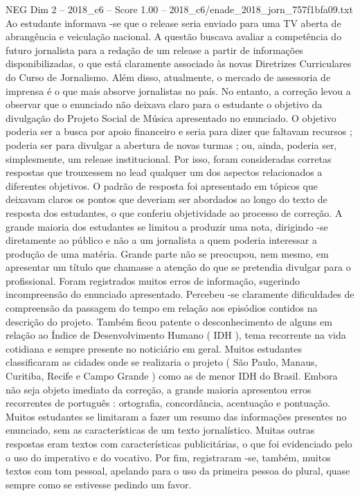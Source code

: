 \begin{textsample}{NEG Dim 2 – 2018\_c6 – Score 1.00 – 2018\_c6/enade\_2018\_jorn\_757f1bfa09.txt}
Ao estudante informava -se que o release seria enviado para uma TV aberta de abrangência e veiculação nacional.
A questão buscava avaliar a competência do futuro jornalista para a redação de um release a partir de informações disponibilizadas, o que está claramente associado às novas Diretrizes Curriculares do Curso de Jornalismo.
Além disso, atualmente, o mercado de assessoria de imprensa é o que mais absorve jornalistas no país.
No entanto, a correção levou a observar que o enunciado não deixava claro para o estudante o objetivo da divulgação do Projeto Social de Música apresentado no enunciado.
O objetivo poderia ser a busca por apoio financeiro e seria para dizer que faltavam recursos ; poderia ser para divulgar a abertura de novas turmas ; ou, ainda, poderia ser, simplesmente, um release institucional.
Por isso, foram consideradas corretas respostas que trouxessem no lead qualquer um dos aspectos relacionados a diferentes objetivos.
O padrão de resposta foi apresentado em tópicos que deixavam claros os pontos que deveriam ser abordados ao longo do texto de resposta dos estudantes, o que conferiu objetividade ao processo de correção.
A grande maioria dos estudantes se limitou a produzir uma nota, dirigindo -se diretamente ao público e não a um jornalista a quem poderia interessar a produção de uma matéria.
Grande parte não se preocupou, nem mesmo, em apresentar um título que chamasse a atenção do que se pretendia divulgar para o profissional.
Foram registrados muitos erros de informação, sugerindo incompreensão do enunciado apresentado.
Percebeu -se claramente dificuldades de compreensão da passagem do tempo em relação aos episódios contidos na descrição do projeto.
Também ficou patente o desconhecimento de alguns em relação ao Índice de Desenvolvimento Humano ( IDH ), tema recorrente na vida cotidiana e sempre presente no noticiário em geral.
Muitos estudantes classificaram as cidades onde se realizaria o projeto ( São Paulo, Manaus, Curitiba, Recife e Campo Grande ) como as de menor IDH do Brasil.
Embora não seja objeto imediato da correção, a grande maioria apresentou erros recorrentes de português : ortografia, concordância, acentuação e pontuação.
Muitos estudantes se limitaram a fazer um resumo das informações presentes no enunciado, sem as características de um texto jornalístico.
Muitas outras respostas eram textos com características publicitárias, o que foi evidenciado pelo o uso do imperativo e do vocativo.
Por fim, registraram -se, também, muitos textos com tom pessoal, apelando para o uso da primeira pessoa do plural, quase sempre como se estivesse pedindo um favor.

\end{textsample}
